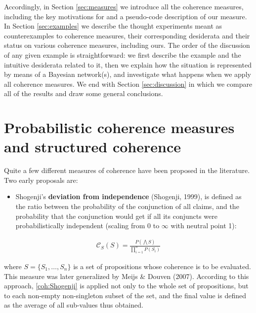 \documentclass[
  10pt,
]{scrartcl}
\providecommand{\tightlist}{%
  \setlength{\itemsep}{0pt}\setlength{\parskip}{0pt}}
\begin{document}
Accordingly, in Section \ref{sec:measures} we introduce all the coherence measures, including the key motivations for and a pseudo-code description of our measure. In Section \ref{sec:examples} we describe the thought experiments meant as counterexamples to coherence measures, their corresponding desiderata and their status on various coherence measures, including ours. The order of the discussion of any given example is straightforward: we first describe the example and the intuitive desiderata related to it, then we explain how the situation is represented by means of a Bayesian network(s), and investigate what happens when we apply all coherence measures. We end with Section \ref{sec:discussion} in which we compare all of the results and draw some general conclusions.

\hypertarget{probabilistic-coherence-measures-and-structured-coherence}{%
\section{Probabilistic coherence measures and structured coherence}\label{probabilistic-coherence-measures-and-structured-coherence}}

\label{sec:measures}

Quite a few different measures of coherence have been proposed in the literature. Two early proposals are:

\begin{itemize}
\tightlist
\item
  Shogenji's \textbf{deviation from independence} (Shogenji, 1999), is defined as the ratio between the probability of the
  conjunction of all claims, and the probability that the conjunction
  would get if all its conjuncts were probabilistically independent (scaling from 0 to \(\infty\) with neutral point 1):
\end{itemize}

\begin{align}
    \tag{Shogenji}
    \label{coh:Shogenji}
     \mathcal{C}_{S}(S)=\frac{P(\bigwedge S)}{\prod_{i=1}^{n}P(S_i)}
\end{align}

\noindent where \(S=\{S_1, \dots, S_n\}\) is a set of propositions whose coherence is to be evaluated. This measure was later generalized by Meijs \& Douven (2007). According to this approach, \eqref{coh:Shogenji} is applied not only to the whole set of propositions, but to each non-empty non-singleton subset of the set, and the final value is defined as the average of all sub-values thus obtained.
\end{document}

